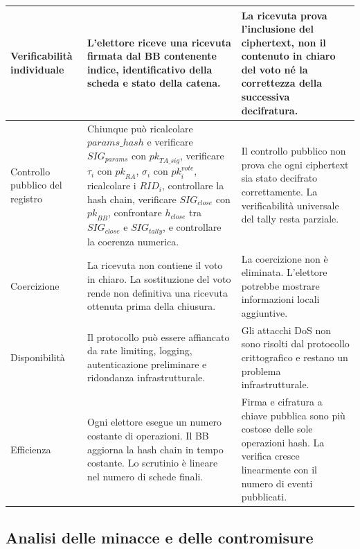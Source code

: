 \documentclass[12pt,a4paper]{article}
\newcommand{\pk}{\mathit{pk}}
\begin{document}
\begin{small}
\begin{longtable}{>{\raggedright}p{2.5cm} p{5.5cm} p{5cm}}
Verificabilit\`a individuale &
L'elettore riceve una ricevuta firmata dal BB contenente indice, identificativo della scheda e stato della catena. &
La ricevuta prova l'inclusione del ciphertext, non il contenuto in chiaro del voto n\'e la correttezza della successiva decifratura. \\
\midrule

Controllo pubblico del registro &
Chiunque pu\`o ricalcolare $\mathit{params\_hash}$ e verificare $\mathit{SIG}_{\mathit{params}}$ con $\pk_{\mathit{TA\_sig}}$, verificare $\tau_i$ con $\pk_{\mathit{RA}}$, $\sigma_i$ con $\pk_i^{\mathit{vote}}$, ricalcolare i $\mathit{RID}_i$, controllare la hash chain, verificare $\mathit{SIG}_{\mathit{close}}$ con $\pk_{\mathit{BB}}$, confrontare $h_{\mathit{close}}$ tra $\mathit{SIG}_{\mathit{close}}$ e $\mathit{SIG}_{\mathit{tally}}$, e controllare la coerenza numerica.
 &
Il controllo pubblico non prova che ogni ciphertext sia stato decifrato correttamente. La verificabilit\`a universale del tally resta parziale. \\
\midrule

Coercizione &
La ricevuta non contiene il voto in chiaro. La sostituzione del voto rende non definitiva una ricevuta ottenuta prima della chiusura. &
La coercizione non \`e eliminata. L'elettore potrebbe mostrare informazioni locali aggiuntive. \\
\midrule

Disponibilit\`a &
Il protocollo pu\`o essere affiancato da rate limiting, logging, autenticazione preliminare e ridondanza infrastrutturale. &
Gli attacchi DoS non sono risolti dal protocollo crittografico e restano un problema infrastrutturale. \\
\midrule

Efficienza &
Ogni elettore esegue un numero costante di operazioni. Il BB aggiorna la hash chain in tempo costante. Lo scrutinio \`e lineare nel numero di schede finali. &
Firma e cifratura a chiave pubblica sono pi\`u costose delle sole operazioni hash. La verifica cresce linearmente con il numero di eventi pubblicati. \\
\bottomrule
\end{longtable}
\end{small}

\subsection{Analisi delle minacce e delle contromisure}
\end{document}
